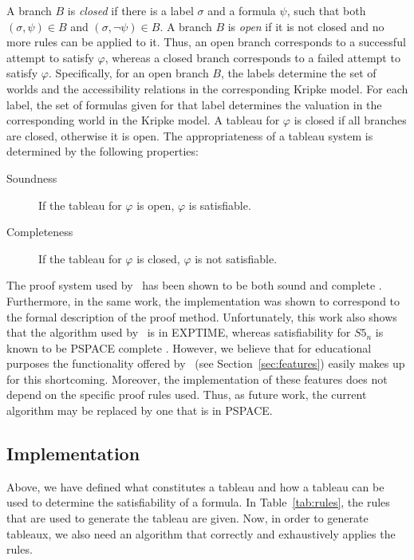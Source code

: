 A branch $B$ is {\em closed} if there is a label $\sigma$ and a formula
$\psi$, such that both $(\sigma, \psi) \in B$ and $(\sigma, \neg \psi)
\in B$. A branch $B$ is {\em open} if it is not closed and no more rules can be
applied to it. Thus, an open branch corresponds to a successful attempt to
satisfy $\varphi$, whereas a closed branch corresponds to a failed attempt to
satisfy $\varphi$. 
Specifically, for an open branch $B$, the labels determine the set of worlds
and the accessibility relations in the corresponding Kripke model. For each
label, the set of formulas given for that label determines the valuation in the
corresponding world in the Kripke model.
A tableau for $\varphi$ is closed if all branches are
closed, otherwise it is open. The appropriateness of a tableau system is
determined by the following properties:
\begin{description}
\item[Soundness] If the tableau for $\varphi$ is open, $\varphi$ is satisfiable.
\item[Completeness] If the tableau for $\varphi$ is closed, $\varphi$ is not
satisfiable.
\end{description}


The proof system used by \oops\ has been shown to be both sound and complete
\citep{valkenhoef2008}.  Furthermore, in the same work, the implementation was
shown to correspond to the formal description of the proof method.
Unfortunately, this work also shows that the algorithm used by \oops\ is in
{\sc EXPTIME}, whereas satisfiability for $S5_n$ is known to be {\sc PSPACE}
complete \citep{halpern1992}.
However, we believe that for educational purposes the functionality  offered
by \oops\ (see Section~\ref{sec:features}) easily makes up for this
shortcoming. Moreover, the implementation of these features does not depend on
the specific proof rules used. Thus, as future work, the current algorithm may
be replaced by one that is in {\sc PSPACE}.

\subsection{Implementation}

Above, we have defined what constitutes a tableau and how a tableau can be used
to determine the satisfiability of a formula. In Table~\ref{tab:rules}, the
rules that are used to generate the tableau are given. Now, in order to
generate tableaux, we also need an algorithm that correctly and exhaustively
applies the rules.

